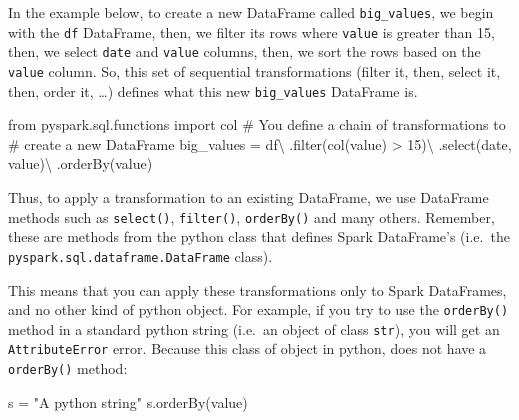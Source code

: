 \documentclass[
  11pt,
  letterpaper,
  DIV=11,
  numbers=noendperiod]{scrreprt}
\newenvironment{Shaded}{\begin{snugshade}}{\end{snugshade}}
\newcommand{\BuiltInTok}[1]{\textcolor[rgb]{0.00,0.23,0.31}{#1}}
\newcommand{\CommentTok}[1]{\textcolor[rgb]{0.37,0.37,0.37}{#1}}
\newcommand{\DecValTok}[1]{\textcolor[rgb]{0.68,0.00,0.00}{#1}}
\newcommand{\ImportTok}[1]{\textcolor[rgb]{0.00,0.46,0.62}{#1}}
\newcommand{\NormalTok}[1]{\textcolor[rgb]{0.00,0.23,0.31}{#1}}
\newcommand{\OperatorTok}[1]{\textcolor[rgb]{0.37,0.37,0.37}{#1}}
\newcommand{\StringTok}[1]{\textcolor[rgb]{0.13,0.47,0.30}{#1}}
\begin{document}
In the example below, to create a new DataFrame called
\texttt{big\_values}, we begin with the \texttt{df} DataFrame, then, we
filter its rows where \texttt{value} is greater than 15, then, we select
\texttt{date} and \texttt{value} columns, then, we sort the rows based
on the \texttt{value} column. So, this set of sequential transformations
(filter it, then, select it, then, order it, \ldots) defines what this
new \texttt{big\_values} DataFrame is.

\begin{Shaded}
\begin{Highlighting}[]
\ImportTok{from}\NormalTok{ pyspark.sql.functions }\ImportTok{import}\NormalTok{ col}
\CommentTok{\# You define a chain of transformations to}
\CommentTok{\# create a new DataFrame}
\NormalTok{big\_values }\OperatorTok{=}\NormalTok{ df}\OperatorTok{\textbackslash{}}
\NormalTok{  .}\BuiltInTok{filter}\NormalTok{(col(}\StringTok{\textquotesingle{}value\textquotesingle{}}\NormalTok{) }\OperatorTok{\textgreater{}} \DecValTok{15}\NormalTok{)}\OperatorTok{\textbackslash{}}
\NormalTok{  .select(}\StringTok{\textquotesingle{}date\textquotesingle{}}\NormalTok{, }\StringTok{\textquotesingle{}value\textquotesingle{}}\NormalTok{)}\OperatorTok{\textbackslash{}}
\NormalTok{  .orderBy(}\StringTok{\textquotesingle{}value\textquotesingle{}}\NormalTok{)}
\end{Highlighting}
\end{Shaded}

Thus, to apply a transformation to an existing DataFrame, we use
DataFrame methods such as \texttt{select()}, \texttt{filter()},
\texttt{orderBy()} and many others. Remember, these are methods from the
python class that defines Spark DataFrame's (i.e.~the
\texttt{pyspark.sql.dataframe.DataFrame} class).

This means that you can apply these transformations only to Spark
DataFrames, and no other kind of python object. For example, if you try
to use the \texttt{orderBy()} method in a standard python string
(i.e.~an object of class \texttt{str}), you will get an
\texttt{AttributeError} error. Because this class of object in python,
does not have a \texttt{orderBy()} method:

\begin{Shaded}
\begin{Highlighting}[]
\NormalTok{s }\OperatorTok{=} \StringTok{"A python string"}
\NormalTok{s.orderBy(}\StringTok{\textquotesingle{}value\textquotesingle{}}\NormalTok{)}
\end{Highlighting}
\end{Shaded}
\end{document}
